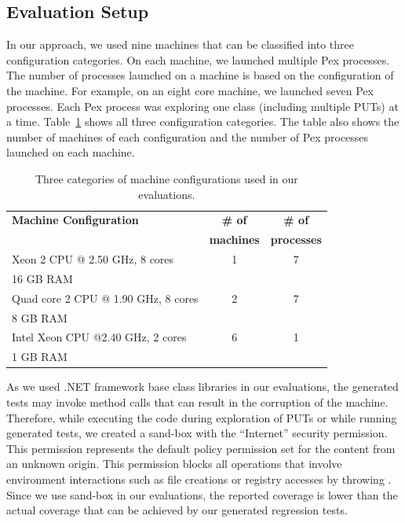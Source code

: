 \subsection{Evaluation Setup}

In our approach, we used nine machines that can be classified into three 
configuration categories. On each machine, we launched multiple Pex
processes. The number of processes launched on a machine is
based on the configuration of the machine. For example, on an
eight core machine, we launched seven Pex processes. Each Pex process
was exploring one class (including multiple PUTs) at a time.
Table~\ref{tab:mconfig} shows all three configuration
categories. The table also shows the number of machines
of each configuration and the number of Pex processes launched on each machine.

\setlength{\tabcolsep}{1pt}
\begin{table}[t]
\begin{SmallOut}
\begin{CodeOut}
\begin{center}
\begin {tabular} {|l|c|c|}
\hline
\textbf{Machine Configuration} & \textbf{\# of} & \textbf{\# of} \\  
 & \textbf{machines} & \textbf{processes}\\  
\hline
\hline  Xeon 2 CPU @ 2.50 GHz, 8 cores & 1 & 7\\
				16 GB RAM & & \\
\hline  Quad core 2 CPU @ 1.90 GHz, 8 cores& 2 & 7\\
				8 GB RAM & & \\
\hline  Intel Xeon CPU @2.40 GHz, 2 cores& 6 & 1\\
				1 GB RAM & & \\
\hline
\end{tabular}
\end{center}
\end{CodeOut}
\end{SmallOut}\vspace*{-4ex}
\centering \caption {\label{tab:mconfig}Three categories of machine configurations used in our evaluations.}
\end{table}

As we used .NET framework base class libraries in our evaluations, the generated tests
may invoke method calls that can result in the corruption of the machine. Therefore,
while executing the code during exploration of PUTs or while running generated tests,
we created a sand-box with the ``Internet'' security permission. This permission
represents the default policy permission set for the content from an unknown origin.
This permission blocks all operations that involve environment interactions such
as file creations or registry accesses by throwing .
Since we use sand-box in our evaluations, the reported coverage
is lower than the actual coverage that can be achieved by our generated regression
tests.

